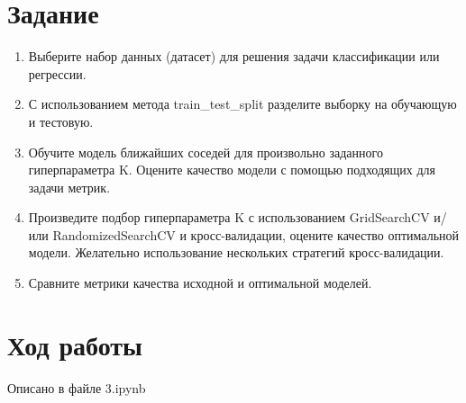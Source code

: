 \documentclass[a4paper]{article}
\begin{document}
  \section*{Задание}
  \begin{enumerate}
    \item Выберите набор данных (датасет) для решения задачи классификации или регрессии.
    \item С использованием метода train\_test\_split разделите выборку на обучающую и тестовую.
    \item
      Обучите модель ближайших соседей для произвольно заданного гиперпараметра K.
      Оцените качество модели с помощью подходящих для задачи метрик.
    \item
      Произведите подбор гиперпараметра K с использованием GridSearchCV и/или RandomizedSearchCV
      и кросс-валидации, оцените качество оптимальной модели.
      Желательно использование нескольких стратегий кросс-валидации.
    \item Сравните метрики качества исходной и оптимальной моделей.
  \end{enumerate}

  \section*{Ход работы}
  Описано в файле 3.ipynb
\end{document}
